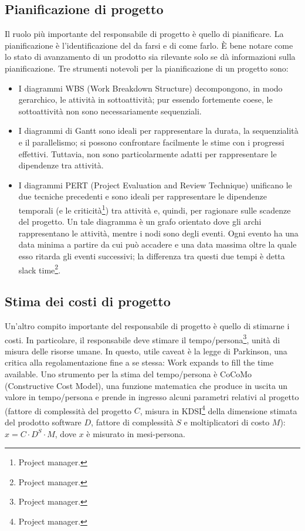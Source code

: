 \documentclass[a4paper]{article}
\begin{document}
		
	\subsection{Pianificazione di progetto}

		
Il ruolo più importante del responsabile di progetto è quello di pianificare. La pianificazione è l'identificazione del da farsi e di come farlo. È bene notare come lo stato di avanzamento di un prodotto sia rilevante solo se dà informazioni sulla pianificazione. Tre strumenti notevoli per la pianificazione di un progetto sono:
		
	\begin{itemize}
		
			
	\item I diagrammi WBS (Work Breakdown Structure) decompongono, in modo gerarchico, le attività in sottoattività; pur essendo fortemente coese, le sottoattività non sono necessariamente sequenziali.
			
	\item I diagrammi di Gantt sono ideali per rappresentare la durata, la sequenzialità e il parallelismo; si possono confrontare facilmente le stime con i progressi effettivi. Tuttavia, non sono particolarmente adatti per rappresentare le dipendenze tra attività.
			
	\item I diagrammi PERT (Project Evaluation and Review Technique) unificano le due tecniche precedenti e sono ideali per rappresentare le dipendenze temporali (e le criticità\footnote{Project manager.}) tra attività e, quindi, per ragionare sulle scadenze del progetto. Un tale diagramma è un grafo orientato dove gli archi rappresentano le attività, mentre i nodi sono degli eventi. Ogni evento ha una data minima a partire da cui può accadere e una data massima oltre la quale esso ritarda gli eventi successivi; la differenza tra questi due tempi è detta slack time\footnote{Project manager.}.
		
	\end{itemize}


		
	\subsection{Stima dei costi di progetto}

		
Un'altro compito importante del responsabile di progetto è quello di stimarne i costi. In particolare, il responsabile deve stimare il tempo/persona\footnote{Project manager.}, unità di misura delle risorse umane. In questo, utile caveat è la legge di Parkinson, una critica alla regolamentazione fine a se stessa: Work expands to fill the time available. Uno strumento per la stima del tempo/persona è CoCoMo (Constructive Cost Model), una funzione matematica che produce in uscita un valore in tempo/persona e prende in ingresso alcuni parametri relativi al progetto (fattore di complessità del progetto $C$, misura in KDSI\footnote{Project manager.} della dimensione stimata del prodotto software $D$, fattore di complessità $S$ e moltiplicatori di costo $M$): $x = C \cdot{} D^{S} \cdot{} M$, dove $x$ è misurato in mesi-persona.
\end{document}
